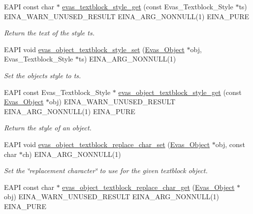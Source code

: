 \begin{DoxyCompactItemize}
EAPI const char $\ast$ \hyperlink{group__Evas__Object__Textblock_gae106e0cfb957f1916eb3833c1214394c}{evas\_\-textblock\_\-style\_\-get} (const Evas\_\-Textblock\_\-Style $\ast$ts) EINA\_\-WARN\_\-UNUSED\_\-RESULT EINA\_\-ARG\_\-NONNULL(1) EINA\_\-PURE
\begin{DoxyCompactList}\small\item\em Return the text of the style ts. \item\end{DoxyCompactList}\item 
EAPI void \hyperlink{group__Evas__Object__Textblock_gaf581b9400cb7176a137451ab6193e3c0}{evas\_\-object\_\-textblock\_\-style\_\-set} (\hyperlink{group__Evas__Object__Group_ga9e19e6dd1f517a0ba437c0114d3e7c97}{Evas\_\-Object} $\ast$obj, Evas\_\-Textblock\_\-Style $\ast$ts) EINA\_\-ARG\_\-NONNULL(1)
\begin{DoxyCompactList}\small\item\em Set the objects style to ts. \item\end{DoxyCompactList}\item 
EAPI const Evas\_\-Textblock\_\-Style $\ast$ \hyperlink{group__Evas__Object__Textblock_ga9f3164f28981c6d6188a8de202848197}{evas\_\-object\_\-textblock\_\-style\_\-get} (const \hyperlink{group__Evas__Object__Group_ga9e19e6dd1f517a0ba437c0114d3e7c97}{Evas\_\-Object} $\ast$obj) EINA\_\-WARN\_\-UNUSED\_\-RESULT EINA\_\-ARG\_\-NONNULL(1) EINA\_\-PURE
\begin{DoxyCompactList}\small\item\em Return the style of an object. \item\end{DoxyCompactList}\item 
EAPI void \hyperlink{group__Evas__Object__Textblock_gab5d3958f4d73b2d9e3cccd828816b672}{evas\_\-object\_\-textblock\_\-replace\_\-char\_\-set} (\hyperlink{group__Evas__Object__Group_ga9e19e6dd1f517a0ba437c0114d3e7c97}{Evas\_\-Object} $\ast$obj, const char $\ast$ch) EINA\_\-ARG\_\-NONNULL(1)
\begin{DoxyCompactList}\small\item\em Set the \char`\"{}replacement character\char`\"{} to use for the given textblock object. \item\end{DoxyCompactList}\item 
EAPI const char $\ast$ \hyperlink{group__Evas__Object__Textblock_ga61f6c6ea8c0ce2028424396eb2ff4a81}{evas\_\-object\_\-textblock\_\-replace\_\-char\_\-get} (\hyperlink{group__Evas__Object__Group_ga9e19e6dd1f517a0ba437c0114d3e7c97}{Evas\_\-Object} $\ast$obj) EINA\_\-WARN\_\-UNUSED\_\-RESULT EINA\_\-ARG\_\-NONNULL(1) EINA\_\-PURE

\end{DoxyCompactItemize}
